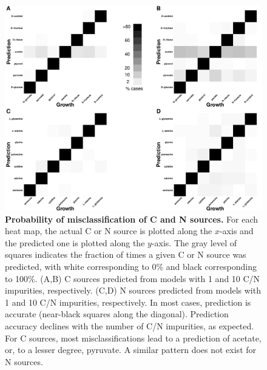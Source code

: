 \documentclass[12pt]{article}
\begin{document}
\clearpage
\begin{figure}[p]
\centerline{\includegraphics[width=6in]{Figures/heatmap.pdf}}
\caption{\label{fig:heat_map}\textbf{Probability of misclassification of C and N sources.} For each heat map, the actual C or N source is plotted along the $x$-axis and the predicted one is plotted along the $y$-axis. The gray level of squares indicates the fraction of times a given C or N source was predicted, with white corresponding to 0\% and black corresponding to 100\%. (A,B) C sources predicted from models with 1 and 10 C/N impurities, respectively. (C,D) N sources predicted from models with 1 and 10 C/N impurities, respectively. In most cases, prediction is accurate (near-black squares along the diagonal). Prediction accuracy declines with the number of C/N impurities, as expected. For C sources, most misclassifications lead to a prediction of acetate, or, to a lesser degree, pyruvate. A similar pattern does not exist for N sources.}
\end{figure}
\end{document}
